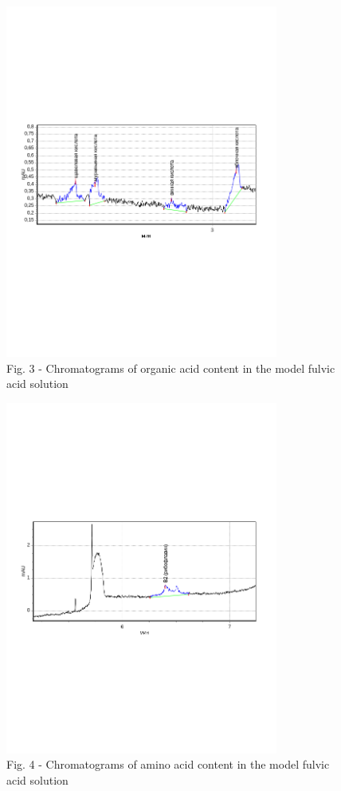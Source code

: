 \begin{figure}[H]
	\centering
	\includegraphics[width=0.8\textwidth]{media/chem/image6}
	\caption*{Fig. 3 - Chromatograms of organic acid content in the model fulvic acid solution}
\end{figure}

\begin{figure}[H]
	\centering
	\includegraphics[width=0.8\textwidth]{media/chem/image7}
	\caption*{Fig. 4 - Chromatograms of amino acid content in the model fulvic acid solution}
\end{figure}

